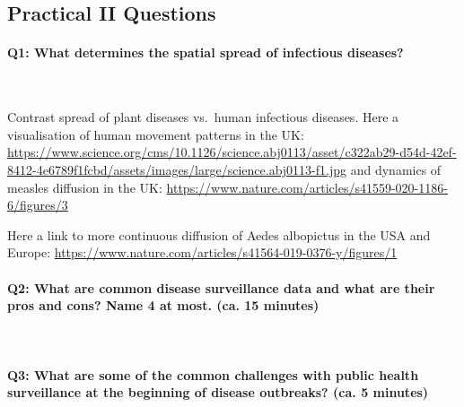 \documentclass[
  11pt,
]{article}
\begin{document}
\hypertarget{practical-ii-questions}{%
\subsection{Practical II Questions}\label{practical-ii-questions}}

\hypertarget{q1-what-determines-the-spatial-spread-of-infectious-diseases}{%
\paragraph{Q1: What determines the spatial spread of infectious
diseases?}\label{q1-what-determines-the-spatial-spread-of-infectious-diseases}}

~

Contrast spread of plant diseases vs.~human infectious diseases. Here a
visualisation of human movement patterns in the UK:
\url{https://www.science.org/cms/10.1126/science.abj0113/asset/c322ab29-d54d-42ef-8412-4e6789f1fcbd/assets/images/large/science.abj0113-f1.jpg}
and dynamics of measles diffusion in the UK:
\url{https://www.nature.com/articles/s41559-020-1186-6/figures/3}

Here a link to more continuous diffusion of Aedes albopictus in the USA
and Europe:
\url{https://www.nature.com/articles/s41564-019-0376-y/figures/1}

\hypertarget{q2-what-are-common-disease-surveillance-data-and-what-are-their-pros-and-cons-name-4-at-most.-ca.-15-minutes}{%
\paragraph{Q2: What are common disease surveillance data and what are
their pros and cons? Name 4 at most. (ca. 15
minutes)}\label{q2-what-are-common-disease-surveillance-data-and-what-are-their-pros-and-cons-name-4-at-most.-ca.-15-minutes}}

~

\hypertarget{q3-what-are-some-of-the-common-challenges-with-public-health-surveillance-at-the-beginning-of-disease-outbreaks-ca.-5-minutes}{%
\paragraph{Q3: What are some of the common challenges with public health
surveillance at the beginning of disease outbreaks? (ca. 5
minutes)}\label{q3-what-are-some-of-the-common-challenges-with-public-health-surveillance-at-the-beginning-of-disease-outbreaks-ca.-5-minutes}}
\end{document}
